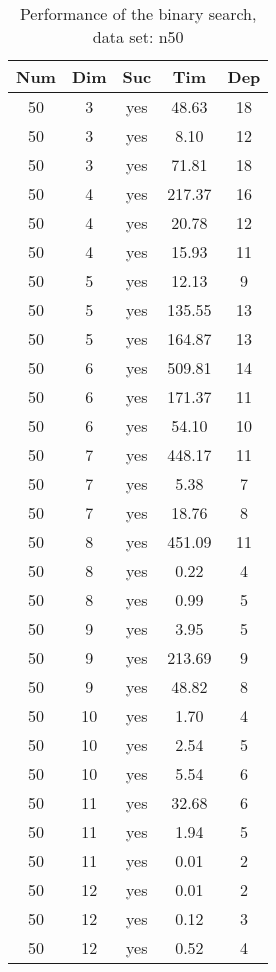 \begin{table}[!htb]
  \centering
  \begin{tabular}[center]{|c|c|c|c|c|}
    \hline
    Num & Dim & Suc & Tim & Dep \\
    \hline
    50 & 3 & yes & 48.63 & 18 \\
    50 & 3 & yes & 8.10 & 12 \\
    50 & 3 & yes & 71.81 & 18 \\
    50 & 4 & yes & 217.37 & 16 \\
    50 & 4 & yes & 20.78 & 12 \\
    50 & 4 & yes & 15.93 & 11 \\
    50 & 5 & yes & 12.13 & 9 \\
    50 & 5 & yes & 135.55 & 13 \\
    50 & 5 & yes & 164.87 & 13 \\
    50 & 6 & yes & 509.81 & 14 \\
    50 & 6 & yes & 171.37 & 11 \\
    50 & 6 & yes & 54.10 & 10 \\
    50 & 7 & yes & 448.17 & 11 \\
    50 & 7 & yes & 5.38 & 7 \\
    50 & 7 & yes & 18.76 & 8 \\
    50 & 8 & yes & 451.09 & 11 \\
    50 & 8 & yes & 0.22 & 4 \\
    50 & 8 & yes & 0.99 & 5 \\
    50 & 9 & yes & 3.95 & 5 \\
    50 & 9 & yes & 213.69 & 9 \\
    50 & 9 & yes & 48.82 & 8 \\
    50 & 10 & yes & 1.70 & 4 \\
    50 & 10 & yes & 2.54 & 5 \\
    50 & 10 & yes & 5.54 & 6 \\
    50 & 11 & yes & 32.68 & 6 \\
    50 & 11 & yes & 1.94 & 5 \\
    50 & 11 & yes & 0.01 & 2 \\
    50 & 12 & yes & 0.01 & 2 \\
    50 & 12 & yes & 0.12 & 3 \\
    50 & 12 & yes & 0.52 & 4 \\
    \hline
  \end{tabular}
  \caption{Performance of the binary search, data set: n50}
  \label{tab:test.bin-n50}
\end{table}


